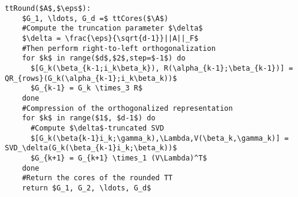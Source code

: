 

\begin{lstlisting}[float, caption=TT-rounding algorithm, label=algo:tt-round, title=TT-rounding algorithm]
  ttRound($A$,$\eps$):
    $G_1, \ldots, G_d =$ ttCores($\A$)
    #Compute the truncation parameter $\delta$
    $\delta = \frac{\eps}{\sqrt{d-1}}||A||_F$
    #Then perform right-to-left orthogonalization
    for $k$ in range($d$,$2$,step=$-1$) do
      $[G_k(\beta_{k-1;i_k\beta_k}), R(\alpha_{k-1};\beta_{k-1})] = QR_{rows}(G_k(\alpha_{k-1};i_k\beta_k))$
      $G_{k-1} = G_k \times_3 R$
    done
    #Compression of the orthogonalized representation
    for $k$ in range($1$, $d-1$) do
      #Compute $\delta$-truncated SVD
      $[G_k(\beta{k-1}i_k;\gamma_k),\Lambda,V(\beta_k,\gamma_k)] = SVD_\delta(G_k(\beta_{k-1}i_k;\beta_k))$
      $G_{k+1} = G_{k+1} \times_1 (V\Lambda)^T$
    done
    #Return the cores of the rounded TT
    return $G_1, G_2, \ldots, G_d$
\end{lstlisting}
